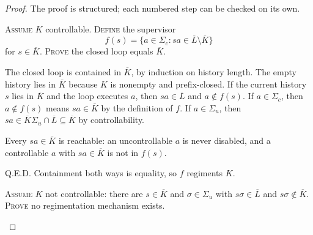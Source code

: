 \documentclass[11pt,a4paper]{article}
\theoremstyle{definition}
\theoremstyle{remark}
\begin{document}
\begin{proof}
\setlength{\parskip}{4pt plus 1pt}
The proof is structured; each numbered step can be checked on its own.
\begin{description}[leftmargin=2.6em,style=nextline,itemsep=2pt]
\item[$\langle 1\rangle 1.$] \textsc{Assume} $K$ controllable. \textsc{Define} the supervisor
  \[
  f(s) = \{a \in \Sigma_c : sa \in \overline{L} \setminus \overline{K}\}
\]
  for $s \in
  \overline{K}$. \textsc{Prove} the closed loop equals $\overline{K}$.
  \begin{description}[leftmargin=2.6em,style=nextline,itemsep=1pt]
  \item[$\langle 2\rangle 1.$] The closed loop is contained in $\overline{K}$, by induction on
    history length. The empty history lies in $\overline{K}$ because $K$ is nonempty and
    prefix-closed. If the current history $s$ lies in $\overline{K}$ and the loop executes
    $a$, then $sa \in \overline{L}$ and $a \notin f(s)$. If $a \in \Sigma_c$, then
    $a \notin f(s)$ means $sa \in \overline{K}$ by the definition of $f$. If $a \in \Sigma_u$,
    then $sa \in \overline{K}\Sigma_u \cap \overline{L} \subseteq \overline{K}$ by
    controllability.
  \item[$\langle 2\rangle 2.$] Every $sa \in \overline{K}$ is reachable: an uncontrollable
    $a$ is never disabled, and a controllable $a$ with $sa \in \overline{K}$ is not in $f(s)$.
  \item[$\langle 2\rangle 3.$] \textsc{Q.E.D.} Containment both ways is equality, so $f$
    regiments $K$.
  \end{description}
\item[$\langle 1\rangle 2.$] \textsc{Assume} $K$ not controllable: there are $s \in
  \overline{K}$ and $\sigma \in \Sigma_u$ with $s\sigma \in \overline{L}$ and $s\sigma \notin
  \overline{K}$. \textsc{Prove} no regimentation mechanism exists.
\end{description}
\end{proof}
\end{document}

